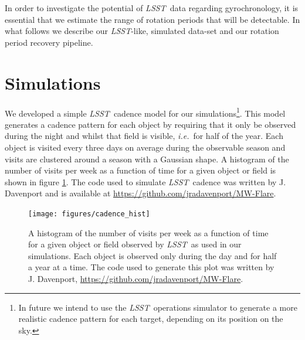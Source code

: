 \documentclass[useAMS, usenatbib, preprint, 12pt]{aastex}
\newcommand{\LSST}{{\it LSST}}
\newcommand{\ie}{{\it i.e.}}
\begin{document}
In order to investigate the potential of \LSST\ data regarding gyrochronology,
it is essential that we estimate the range of rotation periods that will be
detectable.
In what follows we describe our \LSST-like, simulated data-set and our
rotation period recovery pipeline.

\section{Simulations}
We developed a simple \LSST\ cadence model for our simulations\footnote{In
future we intend to use the \LSST\ operations simulator
\citep[OpSim][]{Ridgway2012} to generate a more realistic cadence pattern for
each target, depending on its position on the sky.}.
This model generates a cadence pattern for each object by requiring that it
only be observed during the night and whilst that field is visible, \ie\ for
half of the year.
Each object is visited every three days on average during the observable
season and visits are clustered around a season with a Gaussian shape.
A histogram of the number of visits per week as a function of time for a given
object or field is shown in figure \ref{fig:cadence_hist}.
The code used to simulate \LSST\ cadence was written by J. Davenport and is
available at \url{https://github.com/jradavenport/MW-Flare}.

\begin{figure}
\begin{center}
\texttt{[image: figures/cadence\_hist]}
\caption{A histogram of the number of visits per week as a function of time
for a given object or field observed by \LSST\, as used in our simulations.
Each object is observed only during the day and for half a year at a time.
The code used to generate this plot was written by J. Davenport,
\protect\url{https://github.com/jradavenport/MW-Flare}.}
\label{fig:cadence_hist}
\end{center}
\end{figure}
\end{document}
